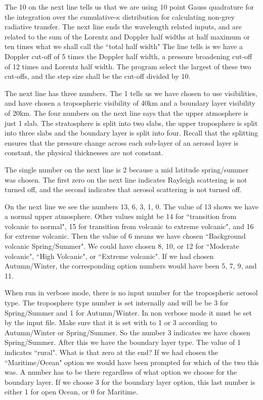 \documentclass[12pt]{article}
\begin{document}
The 10 on the next line tells us that we are using
10 point Gauss quadrature for the integration over the cumulative-$\kappa$ distribution for calculating non-grey 
radiative transfer. The next line ends the wavelength related inputs, and are related to the sum of the
Lorentz and Doppler half widths at half maximum or ten times what we shall call the ``total half width"
The line tells is we have a Doppler cut-off of 5 times the Doppler half width, a pressure broadening 
cut-off of 12 times and Lorentz half width. The program select the largest of these two cut-offs,
 and the step size shall be the cut-off divided by 10.

 The next line has three numbers. The 1 tells us we have chosen to
 use visibilities,  and have chosen a tropospheric visibility of 40km and a boundary layer visibility
of 20km. The four numbers on the next line says that the 
upper atmosphere is just 1 slab. The stratosphere is split into two slabs, the upper
troposphere is split into three slabs and the boundary layer is split into four. Recall 
that the splitting ensures that the pressure change across each sub-layer of an
aerosol layer is constant, the physical thicknesses are not constant.

The single number on the next line is 2 because a mid latitude spring/summer was chosen.
The first zero on the next line indicates Rayleigh scattering is not turned off, and
the second indicates that aerosol scattering is not turned off.

On the next line we see the numbers 13, 6, 3, 1, 0.
The value of 13 shows we have a normal upper atmosphere. Other values might be 14 for ``transition
from volcanic to normal", 15 for transition from volcanic to extreme volcanic", and 16 for
 extreme volcanic. Then the value of 6 means we have chosen ``Background volcanic Spring/Summer".
We could have chosen 8, 10, or 12 for ``Moderate volcanic", ``High Volcanic", or ``Extreme volcanic".
If we had chosen Autumn/Winter, the corresponding option numbers would have been 5, 7, 9, and 11.

When run in verbose mode, there is no input number for the tropospheric aerosol type. 
The troposphere type number is set
internally and will be 
be 3 for Spring/Summer and 1 for Autumn/Winter. In non verbose mode it must be set by the input file.
Make sure that it is set with to 1 or 3 according to Autumn/Winter or Spring/Summer. 
So the number 3 indicates we have chosen Spring/Summer. After this we have the boundary layer type.
The value of 1 indicates ``rural".
What is that zero at the end? If we had chosen the ``Maritime/Ocean" option we would have
been prompted for which of the two this was. A number has to be there regardless of what option
we choose for the boundary layer. If we choose 3 for the boundary layer option, this last number is
either 1 for open Ocean, or 0 for Maritime.
\end{document}
